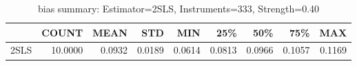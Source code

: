 \begin{table}[ht]
\centering
\caption{bias summary: Estimator=2SLS, Instruments=333, Strength=0.40}
\begin{tabular}{lrrrrrrrr}
\toprule
 & COUNT & MEAN & STD & MIN & 25\% & 50\% & 75\% & MAX \\
\midrule
2SLS & 10.0000 & 0.0932 & 0.0189 & 0.0614 & 0.0813 & 0.0966 & 0.1057 & 0.1169 \\
\bottomrule
\end{tabular}
\end{table}

